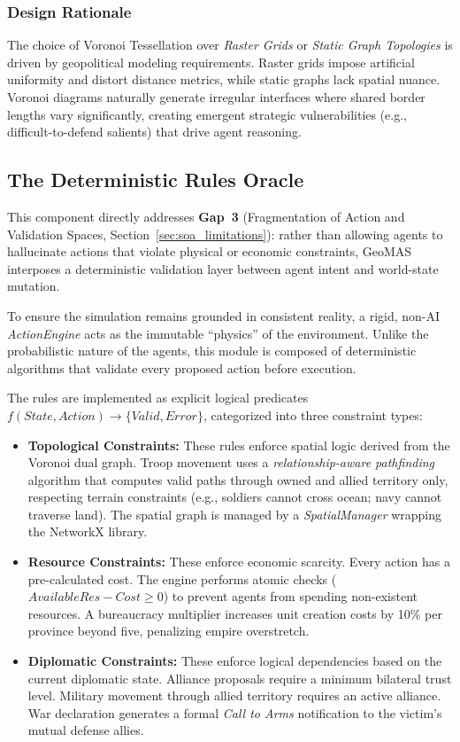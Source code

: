 \subsubsection{Design Rationale} The choice of Voronoi Tessellation over \textit{Raster Grids} or \textit{Static Graph Topologies} is driven by geopolitical modeling requirements. Raster grids impose artificial uniformity and distort distance metrics, while static graphs lack spatial nuance. Voronoi diagrams naturally generate irregular interfaces where shared border lengths vary significantly, creating emergent strategic vulnerabilities (e.g., difficult-to-defend salients) that drive agent reasoning.

\subsection{The Deterministic Rules Oracle}
\label{sec:rules_oracle}
This component directly addresses \textbf{Gap~3} (Fragmentation of Action and Validation Spaces, Section~\ref{sec:soa_limitations}): rather than allowing agents to hallucinate actions that violate physical or economic constraints, GeoMAS interposes a deterministic validation layer between agent intent and world-state mutation.

To ensure the simulation remains grounded in consistent reality, a rigid, non-AI \textit{ActionEngine} acts as the immutable ``physics'' of the environment. Unlike the probabilistic nature of the agents, this module is composed of deterministic algorithms that validate every proposed action before execution.

The rules are implemented as explicit logical predicates $f(State, Action) \rightarrow \{Valid, Error\}$, categorized into three constraint types:
\begin{itemize}
    \item \textbf{Topological Constraints:} These rules enforce spatial logic derived from the Voronoi dual graph. Troop movement uses a \textit{relationship-aware pathfinding} algorithm that computes valid paths through owned and allied territory only, respecting terrain constraints (e.g., soldiers cannot cross ocean; navy cannot traverse land). The spatial graph is managed by a \textit{SpatialManager} wrapping the NetworkX library.
    \item \textbf{Resource Constraints:} These enforce economic scarcity. Every action has a pre-calculated cost. The engine performs atomic checks ($AvailableRes - Cost \geq 0$) to prevent agents from spending non-existent resources. A bureaucracy multiplier increases unit creation costs by 10\% per province beyond five, penalizing empire overstretch.
    \item \textbf{Diplomatic Constraints:} These enforce logical dependencies based on the current diplomatic state. Alliance proposals require a minimum bilateral trust level. Military movement through allied territory requires an active alliance. War declaration generates a formal \textit{Call to Arms} notification to the victim's mutual defense allies.
\end{itemize}

